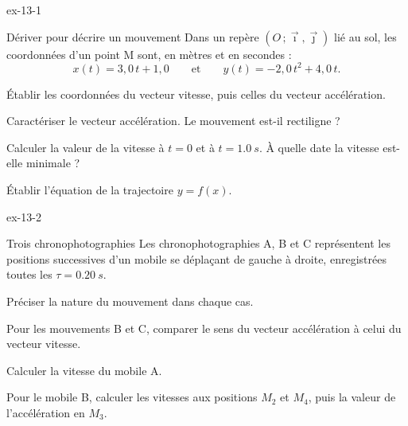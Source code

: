\begin{blocLivre}{ex-13-1}
\begin{exercice}[1]{Dériver pour décrire un mouvement}
Dans un repère $(O\,;\vec{\imath},\vec{\jmath})$ lié au sol, les coordonnées d'un point M sont, en mètres et en secondes :
\[x(t)=3{,}0\,t+1{,}0\qquad\text{et}\qquad y(t)=-2{,}0\,t^2+4{,}0\,t.\]
\begin{questions}
\item Établir les coordonnées du vecteur vitesse, puis celles du vecteur accélération.
\item Caractériser le vecteur accélération. Le mouvement est-il rectiligne ?
\item Calculer la valeur de la vitesse à $t=0$ et à $t=\qty{1,0}{s}$. À quelle date la vitesse est-elle minimale ?
\item Établir l'équation de la trajectoire $y=f(x)$.
\end{questions}
\end{exercice}
\end{blocLivre}
\begin{blocLivre}{ex-13-2}
\begin{exercice}[1]{Trois chronophotographies}
Les chronophotographies A, B et C représentent les positions successives d'un mobile se déplaçant de gauche à droite,
enregistrées toutes les $\tau=\qty{0,20}{s}$.
\begin{questions}
\item Préciser la nature du mouvement dans chaque cas.
\item Pour les mouvements B et C, comparer le sens du vecteur accélération à celui du vecteur vitesse.
\item Calculer la vitesse du mobile A.
\item Pour le mobile B, calculer les vitesses aux positions $M_2$ et $M_4$, puis la valeur de l'accélération en $M_3$.
\end{questions}
\end{exercice}
\end{blocLivre}
